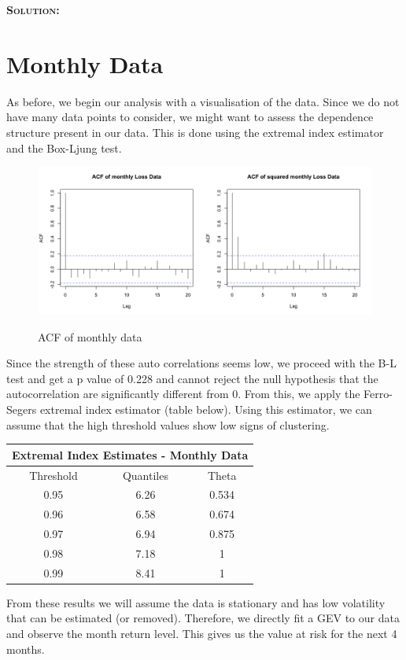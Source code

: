 \documentclass[12pt,oneside]{article}
\newenvironment{solution}
    {\textbf{\textsc{Solution:}}\\}
    {\newpage}
\begin{document}
\begin{solution}
\section*{Monthly Data}
As before, we begin our analysis with a visualisation of the data. Since we do not have many data points to consider, we might want to assess the dependence structure present in our data. This is done using the extremal index estimator and the Box-Ljung test.

\begin{figure}[H]
\begin{center}
{\includegraphics[width=4.5in]{Assignments/a4/mth-acf.png}}
\caption{ACF of monthly data}
\end{center}
\end{figure}
Since the strength of these auto correlations seems low, we proceed with the B-L test and get a p value of 0.228 and cannot reject the null hypothesis that the autocorrelation are significantly different from 0. From this, we apply the Ferro-Segers extremal index estimator (table below). Using this estimator, we can assume that the high threshold values show low signs of clustering.

\begin{center}
\begin{tabular}{ ||c |c |c|| }\hline
\multicolumn{3}{||c||}{Extremal Index Estimates - Monthly Data}\\\hline\hline
Threshold & Quantiles& Theta\\\hline
 0.95 & 6.26 & 0.534 \\ \hline
 0.96 & 6.58 & 0.674 \\  \hline
 0.97 & 6.94 & 0.875  \\\hline  
 0.98 & 7.18 & 1 \\ \hline
 0.99 & 8.41 & 1 \\  \hline
\end{tabular}
\end{center}

 From these results we will assume the data is stationary and has low volatility that can be estimated (or removed).  Therefore, we directly fit a GEV to our data and observe the month return level. This gives us the value at risk for the next 4 months.


\end{solution}
\end{document}
